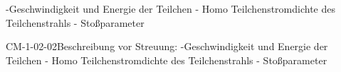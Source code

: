 -Geschwindigkeit und Energie der Teilchen
- Homo Teilchenstromdichte des Teilchenstrahls
- Stoßparameter

\begin{DEF}{CM-1-02-02}{Beschreibung vor Streuung:
-Geschwindigkeit und Energie der Teilchen
- Homo Teilchenstromdichte des Teilchenstrahls
- Stoßparameter}
\end{DEF}
